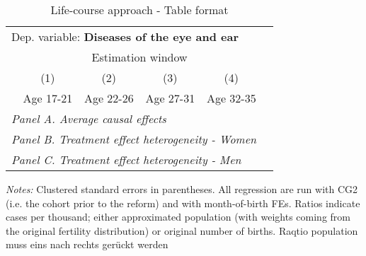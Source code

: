 \begin{table}[H] \centering \begin{threeparttable} \caption{Life-course approach - Table format} {\def\sym#1{\ifmmode^{#1}\else\(^{#1}\)\fi} \begin{tabular}{l*{5}{c}} \toprule \multicolumn{5}{l}{Dep. variable: \textbf{Diseases of the eye and ear}} \\ & \multicolumn{4}{c}{Estimation window} \\ \cmidrule(lr){2-5}
            &\multicolumn{1}{c}{(1)}&\multicolumn{1}{c}{(2)}&\multicolumn{1}{c}{(3)}&\multicolumn{1}{c}{(4)}\\
            &\multicolumn{1}{c}{Age 17-21}&\multicolumn{1}{c}{Age 22-26}&\multicolumn{1}{c}{Age 27-31}&\multicolumn{1}{c}{Age 32-35}\\
\midrule
 \multicolumn{5}{l}{\emph{Panel A. Average causal effects}} \\      \midrule\multicolumn{5}{l}{\emph{Panel B. Treatment effect heterogeneity - Women}} \\      \midrule\multicolumn{5}{l}{\emph{Panel C. Treatment effect heterogeneity - Men}} \\      
\bottomrule \end{tabular} } \begin{tablenotes} \item \scriptsize \emph{Notes:} Clustered standard errors in parentheses. All regression are run with CG2 (i.e. the cohort prior to the reform) and with month-of-birth FEs. Ratios indicate cases per thousand; either approximated population (with weights coming from the original fertility distribution) or original number of births. Raqtio population muss eins nach rechts gerückt werden \end{tablenotes} \end{threeparttable} \end{table} 
